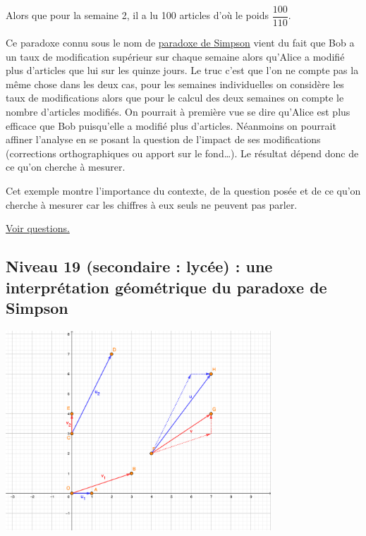 \documentclass[11pt]{article}
\begin{document}
Alors que pour la semaine 2, il a lu 100 articles d'où le
poids \(\dfrac{100}{110}\).



\newpage

Ce paradoxe connu sous le nom de \href{https://fr.wikipedia.org/wiki/Paradoxe\_de\_Simpson}{paradoxe de Simpson} vient du fait que
Bob a un taux de modification supérieur sur chaque semaine alors
qu'Alice a modifié plus d'articles que lui sur les quinze jours. Le
truc c'est que l'on ne compte pas la même chose dans les deux cas,
pour les semaines individuelles on considère les taux de modifications
alors que pour le calcul des deux semaines on compte le nombre
d'articles modifiés. On pourrait à première vue se dire qu'Alice est
plus efficace que Bob puisqu'elle a modifié plus d'articles. Néanmoins
on pourrait affiner l'analyse en se posant la question de l'impact de
ses modifications (corrections orthographiques ou apport sur le
fond\ldots{}). Le résultat dépend donc de ce qu'on cherche à mesurer.


Cet exemple montre l'importance du contexte, de la question posée et
de ce qu'on cherche à mesurer car les chiffres à eux seuls ne peuvent
pas parler.


\hyperref[org563567c]{Voir questions.}


\newpage

\subsection{Niveau 19 (secondaire : lycée) : une interprétation géométrique du paradoxe de Simpson}
\label{sec:org9d5d0e3}

\label{orgab8d939}

\begin{center}
\includegraphics[width=0.9\linewidth, height=7.5cm, keepaspectratio]{./images/vect-simpson.png}
\end{center}
\end{document}
